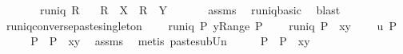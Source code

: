 \begin{isabellebody}
\ \ \ \ \ \ \ {\isachardoublequoteopen}runiq\ {\isacharparenleft}R{\isasyminverse}{\isacharparenright}{\isachardoublequoteclose}\isanewline
\ \ \ {\isachardoublequoteopen}{\isacharparenleft}R\ {\isacharbackquote}{\isacharbackquote}\ X{\isacharparenright}\ {\isasyminter}\ {\isacharparenleft}R\ {\isacharbackquote}{\isacharbackquote}\ Y{\isacharparenright}\ {\isacharequal}\ {\isacharbraceleft}{\isacharbraceright}{\isachardoublequoteclose}\ \isanewline
%
\isadelimproof
\ \ %
\endisadelimproof
%
\isatagproof
{}\isamarkupfalse%
\ assms\ \isamarkupfalse%
\ runiq{\isacharunderscore}basic\ \isamarkupfalse%
\ blast%
\endisatagproof
{\isafoldproof}%
%
\isadelimproof
\isanewline
%
\endisadelimproof
\isanewline
{}\isamarkupfalse%
\ runiq{\isacharunderscore}converse{\isacharunderscore}paste{\isacharunderscore}singleton{\isacharcolon}\ \isanewline
\ \ \ {\isachardoublequoteopen}runiq\ {\isacharparenleft}P{\isacharcircum}{\isacharminus}{}{\isacharparenright}{\isachardoublequoteclose}\ {\isachardoublequoteopen}y{\isasymnotin}{\isacharparenleft}Range\ P{\isacharparenright}{\isachardoublequoteclose}\ \isanewline
\ \ \ {\isachardoublequoteopen}runiq\ {\isacharparenleft}{\isacharparenleft}P\ {\isacharplus}{\isacharasterisk}\ {\isacharbraceleft}{\isacharparenleft}x{\isacharcomma}y{\isacharparenright}{\isacharbraceright}{\isacharparenright}{\isasyminverse}{\isacharparenright}{\isachardoublequoteclose}\ \isanewline
\ \ {\isacharparenleft}\ {\isachardoublequoteopen}{\isacharquery}u\ {\isacharparenleft}{\isacharquery}P{\isacharcircum}{\isacharminus}{}{\isacharparenright}{\isachardoublequoteclose}{\isacharparenright}\isanewline
%
\isadelimproof
%
\endisadelimproof
%
\isatagproof
{}\isamarkupfalse%
\ {\isacharminus}\isanewline
\ \ \isamarkupfalse%
\ {\isachardoublequoteopen}{\isacharparenleft}{\isacharquery}P{\isacharparenright}\ {\isasymsubseteq}\ P\ {\isasymunion}\ {\isacharbraceleft}{\isacharparenleft}x{\isacharcomma}y{\isacharparenright}{\isacharbraceright}{\isachardoublequoteclose}\ \isamarkupfalse%
\ assms\ \isamarkupfalse%
\ {\isacharparenleft}metis\ paste{\isacharunderscore}sub{\isacharunderscore}Un{\isacharparenright}\isanewline
\ \ \isamarkupfalse%
\ \isamarkupfalse%
\ {\isachardoublequoteopen}{\isacharquery}P{\isacharcircum}{\isacharminus}{}\ {\isasymsubseteq}\ P{\isacharcircum}{\isacharminus}{}\ {\isasymunion}\ {\isacharparenleft}{\isacharbraceleft}{\isacharparenleft}x{\isacharcomma}y{\isacharparenright}{\isacharbraceright}{\isacharcircum}{\isacharminus}{}{\isacharparenright}{\isachardoublequoteclose}\ \isamarkupfalse%

\end{isabellebody}
